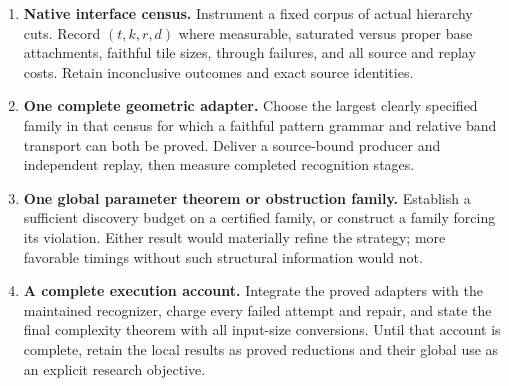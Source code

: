 \begin{enumerate}
\item \textbf{Native interface census.} Instrument a fixed corpus of actual
hierarchy cuts. Record $(t,k,r,d)$ where measurable, saturated versus proper
base attachments, faithful tile sizes, through failures, and all source and
replay costs. Retain inconclusive outcomes and exact source identities.
\item \textbf{One complete geometric adapter.} Choose the largest clearly
specified family in that census for which a faithful pattern grammar and
relative band transport can both be proved. Deliver a source-bound producer
and independent replay, then measure completed recognition stages.
\item \textbf{One global parameter theorem or obstruction family.} Establish
a sufficient discovery budget on a certified family, or construct a family
forcing its violation. Either result would materially refine the strategy;
more favorable timings without such structural information would not.
\item \textbf{A complete execution account.} Integrate the proved adapters
with the maintained recognizer, charge every failed attempt and repair, and
state the final complexity theorem with all input-size conversions. Until
that account is complete, retain the local results as proved reductions and
their global use as an explicit research objective.
\end{enumerate}
